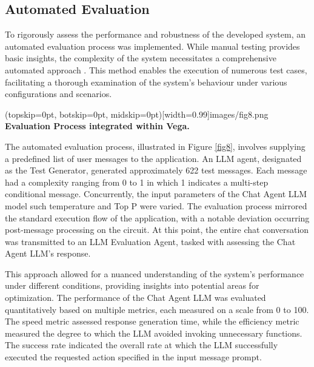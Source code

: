 \documentclass{ieeeaccess}
\begin{document}

\subsection{Automated Evaluation}
To rigorously assess the performance and robustness of the developed system, an automated evaluation process was implemented. While manual testing provides basic insights, the complexity of the system necessitates a comprehensive automated approach \cite{1290484}. This method enables the execution of numerous test cases, facilitating a thorough examination of the system's behaviour under various configurations and scenarios.

\Figure[t!](topskip=0pt, botskip=0pt, midskip=0pt)[width=0.99\columnwidth]{{images/fig8.png}}
{ \textbf{Evaluation Process integrated within Vega.}\label{fig8}}

The automated evaluation process, illustrated in Figure \ref{fig8}, involves supplying a predefined list of user messages to the application. An LLM agent, designated as the Test Generator, generated approximately 622 test messages. Each message had a complexity ranging from 0 to 1 in which 1 indicates a multi-step conditional message. Concurrently, the input parameters of the Chat Agent LLM model such temperature and Top P \cite{rum2024setting} were varied. The evaluation process mirrored the standard execution flow of the application, with a notable deviation occurring post-message processing on the circuit. At this point, the entire chat conversation was transmitted to an LLM Evaluation Agent, tasked with assessing the Chat Agent LLM's response. 

This approach allowed for a nuanced understanding of the system's performance under different conditions, providing insights into potential areas for optimization. The performance of the Chat Agent LLM was evaluated quantitatively based on multiple metrics, each measured on a scale from 0 to 100. The speed metric assessed response generation time, while the efficiency metric measured the degree to which the LLM avoided invoking unnecessary functions. The success rate indicated the overall rate at which the LLM successfully executed the requested action specified in the input message prompt.
\end{document}
